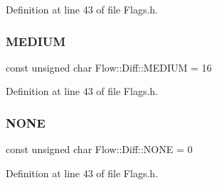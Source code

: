 Definition at line 43 of file Flags.\+h.

\hypertarget{namespace_flow_1_1_diff_a2a571fad912e041a39f438cdabb5b205}{}\label{namespace_flow_1_1_diff_a2a571fad912e041a39f438cdabb5b205} 
\subsubsection{\texorpdfstring{M\+E\+D\+I\+UM}{MEDIUM}}
{\footnotesize\ttfamily const unsigned char Flow\+::\+Diff\+::\+M\+E\+D\+I\+UM = 16}



Definition at line 43 of file Flags.\+h.

\hypertarget{namespace_flow_1_1_diff_a25211e3502f69e2908f0f7a0704a791c}{}\label{namespace_flow_1_1_diff_a25211e3502f69e2908f0f7a0704a791c} 
\subsubsection{\texorpdfstring{N\+O\+NE}{NONE}}
{\footnotesize\ttfamily const unsigned char Flow\+::\+Diff\+::\+N\+O\+NE = 0}



Definition at line 43 of file Flags.\+h.

